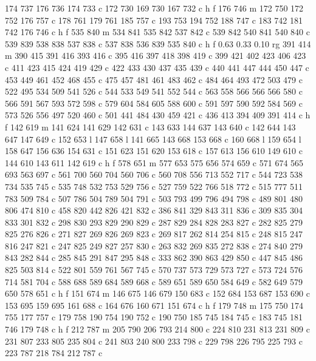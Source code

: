 {{   174 737 176 736 174 733 c
   172 730 169 730 167 732 c
   h f
   176 746 m
   172 750 172 752 176 757 c
   178 761 179 761 185 757 c
   193 753 194 752 188 747 c
   183 742 181 742 176 746 c
   h f
   535 840 m
   534 841 535 842 537 842 c
   539 842 540 841 540 840 c
   539 839 538 838 537 838 c
   537 838 536 839 535 840 c
   h f
   0.63 0.33 0.10 rg
   391 414 m
   390 415 391 416 393 416 c
   395 416 397 418 398 419 c
   399 421 402 423 406 423 c
   411 423 415 424 419 429 c
   422 433 430 437 435 439 c
   440 441 447 444 450 447 c
   453 449 461 452 468 455 c
   475 457 481 461 483 462 c
   484 464 493 472 503 479 c
   522 495 534 509 541 526 c
   544 533 549 541 552 544 c
   563 558 566 566 566 580 c
   566 591 567 593 572 598 c
   579 604 584 605 588 600 c
   591 597 590 592 584 569 c
   573 526 556 497 520 460 c
   501 441 484 430 459 421 c
   436 413 394 409 391 414 c
   h f
   142 619 m
   141 624 141 629 142 631 c
   143 633 144 637 143 640 c
   142 644 143 647 147 649 c
   152 653 l
   147 658 l
   141 665 143 668 153 668 c
   160 668 l
   159 654 l
   158 647 156 636 154 631 c
   151 623 151 620 153 618 c
   157 613 156 610 149 610 c
   144 610 143 611 142 619 c
   h f
   578 651 m
   577 653 575 656 574 659 c
   571 674 565 693 563 697 c
   561 700 560 704 560 706 c
   560 708 556 713 552 717 c
   544 723 538 734 535 745 c
   535 748 532 753 529 756 c
   527 759 522 766 518 772 c
   515 777 511 783 509 784 c
   507 786 504 789 504 791 c
   503 793 499 796 494 798 c
   489 801 480 806 474 810 c
   458 820 442 826 421 832 c
   386 841 329 843 311 836 c
   309 835 304 833 301 832 c
   298 830 293 829 290 829 c
   287 829 284 828 283 827 c
   282 825 279 825 276 826 c
   271 827 269 826 269 823 c
   269 817 262 814 254 815 c
   248 815 247 816 247 821 c
   247 825 249 827 257 830 c
   263 832 269 835 272 838 c
   274 840 279 843 282 844 c
   285 845 291 847 295 848 c
   333 862 390 863 429 850 c
   447 845 486 825 503 814 c
   522 801 559 761 567 745 c
   570 737 573 729 573 727 c
   573 724 576 714 581 704 c
   588 688 589 684 589 668 c
   589 651 589 650 584 649 c
   582 649 579 650 578 651 c
   h f
   151 674 m
   146 675 146 679 150 683 c
   152 684 153 687 153 690 c
   153 695 159 695 161 688 c
   164 676 160 671 151 674 c
   h f
   179 748 m
   175 750 174 755 177 757 c
   179 758 190 754 190 752 c
   190 750 185 745 184 745 c
   183 745 181 746 179 748 c
   h f
   212 787 m
   205 790 206 793 214 800 c
   224 810 231 813 231 809 c
   231 807 233 805 235 804 c
   241 803 240 800 233 798 c
   229 798 226 795 225 793 c
   223 787 218 784 212 787 c
}}
